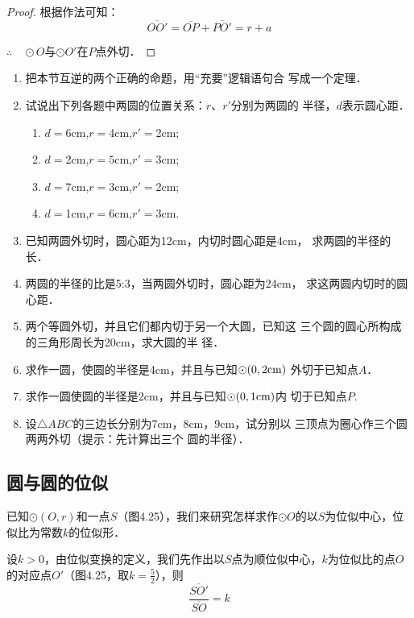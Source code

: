 \begin{proof}
  根据作法可知：
\[\overline{OO'}=\overline{OP}+\overline{PO'}=r+a\]

$\therefore\quad \odot O$与$\odot O'$在$P$点外切．
\end{proof}

\begin{ex}
\begin{enumerate}
\item 把本节互逆的两个正确的命题，用“充要”逻辑语句合
写成一个定理．
\item 试说出下列各题中两圆的位置关系：$r$、$r'$分别为两圆的
半径，$d$表示圆心距．
\begin{enumerate}
\item $d=$6cm,\quad $r=$4cm,\quad $r'=$2cm;
\item $d=$2cm,\quad $r=5$cm,\quad $r'=$3cm;
\item $d=$7cm,\quad $r=3$cm,\quad $r'=$2cm;
\item $d=$1cm,\quad $r=6$cm,\quad $ r'=$3cm.
\end{enumerate}

\item 已知两圆外切时，圆心距为12cm，内切时圆心距是4cm，
求两圆的半径的长．
\item 两圆的半径的比是5:3，当两圆外切时，圆心距为24cm，
求这两圆内切时的圆心距．
\item 两个等圆外切，并且它们都内切于另一个大圆，已知这
三个圆的圆心所构成的三角形周长为20cm，求大圆的半
径．
\item 求作一圆，使圆的半径是4cm，并且与已知$\odot (0,2{\rm cm})$
外切于已知点$A$．
\item 求作一圆使圆的半径是2cm，并且与已知$\odot (0,1{\rm cm})$内
切于已知点$P$.
\item 设$\triangle ABC$的三边长分别为7cm，8cm，9cm，试分别以
三顶点为圈心作三个圆两两外切（提示：先计算出三个
圆的半径）．
\end{enumerate}
\end{ex}

\subsection{圆与圆的位似}
已知$\odot (O,r)$和一点$S$（图4.25），我们来研究怎样求作$\odot O$的以$S$为位似中心，位似比为常数$k$的位似形．

设$k>0$，由位似变换的定义，我们先作出以$S$点为顺位似中心，$k$为位似比的点$O$的对应点$O'$（图4.25，取$k=\frac{5}{2}$），则
\[\frac{\overline{SO'}}{\overline{SO}}=k\]
\begin{figure}[htp]
  \centering
{}
  \caption{}
\end{figure}

